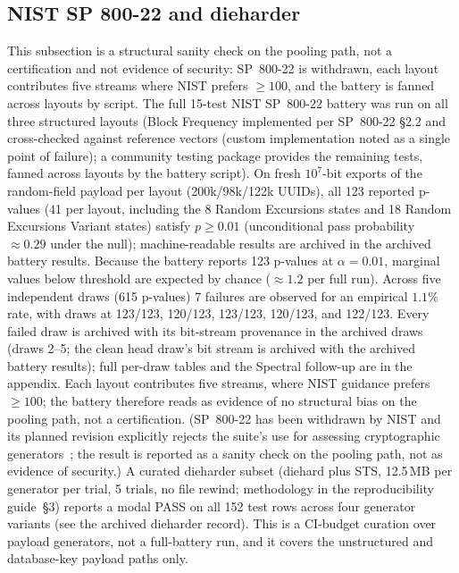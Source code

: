 \documentclass{svproc}
\begin{document}
\subsection{NIST SP 800-22 and dieharder}
\label{sec:nist}
This subsection is a structural sanity check on the pooling path, not a certification and not evidence of security: SP~800-22 is withdrawn, each layout contributes five streams where NIST prefers $\geq 100$, and the battery is fanned across layouts by script. The full 15-test NIST SP~800-22 battery was run on all three structured layouts (Block Frequency implemented per SP~800-22 \S2.2 and cross-checked against reference vectors (custom implementation noted as a single point of failure); a community testing package provides the remaining tests, fanned across layouts by the battery script). On fresh $10^7$-bit exports of the random-field payload per layout (200k/98k/122k UUIDs), all 123 reported p-values (41 per layout, including the 8 Random Excursions states and 18 Random Excursions Variant states) satisfy $p \geq 0.01$ (unconditional pass probability $\approx 0.29$ under the null); machine-readable results are archived in the archived battery results. Because the battery reports 123 p-values at $\alpha=0.01$, marginal values below threshold are expected by chance ($\approx 1.2$ per full run). Across five independent draws (615 p-values) 7 failures are observed for an empirical $1.1\%$ rate, with draws at 123/123, 120/123, 123/123, 120/123, and 122/123. Every failed draw is archived with its bit-stream provenance in the archived draws (draws 2--5; the clean head draw's bit stream is archived with the archived battery results); full per-draw tables and the Spectral follow-up are in the appendix. Each layout contributes five streams, where NIST guidance prefers $\geq 100$; the battery therefore reads as evidence of no structural bias on the pooling path, not a certification. (SP~800-22 has been withdrawn by NIST and its planned revision explicitly rejects the suite's use for assessing cryptographic generators~\cite{2}; the result is reported as a sanity check on the pooling path, not as evidence of security.) A curated dieharder subset (diehard plus STS, 12.5\,MB per generator per trial, 5 trials, no file rewind; methodology in the reproducibility guide~\S3) reports a modal PASS on all 152 test rows across four generator variants (see the archived dieharder record). This is a CI-budget curation over payload generators, not a full-battery run, and it covers the unstructured and database-key payload paths only.
\end{document}
